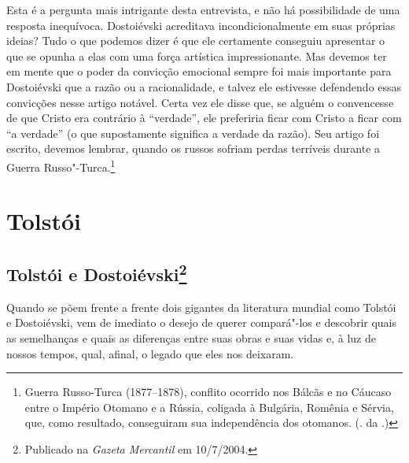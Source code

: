 Esta é a pergunta mais intrigante desta entrevista, e não há
possibilidade de uma resposta inequívoca. Dostoiévski acreditava
incondicionalmente em suas próprias ideias? Tudo o que podemos dizer é
que ele certamente conseguiu apresentar o que se opunha a elas com uma
força artística impressionante. Mas devemos ter em mente que o poder da
convicção emocional sempre foi mais importante para Dostoiévski que a
razão ou a racionalidade, e talvez ele estivesse defendendo essas
convicções nesse artigo notável. Certa vez ele disse que, se alguém o
convencesse de que Cristo era contrário à ``verdade'', ele preferiria ficar
com Cristo a ficar com ``a verdade'' (o que supostamente significa a
verdade da razão). Seu artigo foi escrito, devemos lembrar, quando os
russos sofriam perdas terríveis durante a Guerra Russo"-Turca.\footnote{Guerra Russo-Turca (1877--1878), conflito ocorrido nos Bálcãs e no Cáucaso entre o Império Otomano e a Rússia, coligada à Bulgária, Romênia e Sérvia, que, como resultado, conseguiram sua independência dos otomanos. (. da .)}

\bigskip



\part{Tolstói}

\chapter{Tolstói e Dostoiévski\footnote{Publicado na \emph{Gazeta Mercantil} em 10/7/2004.}}
\label{tolstoidosto}

Quando se põem frente a frente dois gigantes da literatura mundial
como Tolstói e Dostoiévski, vem de imediato o desejo de querer
compará"-los e descobrir quais as semelhanças e quais as
diferenças entre suas obras e suas vidas e, à luz de nossos
tempos, qual, afinal, o legado que eles nos deixaram. 

